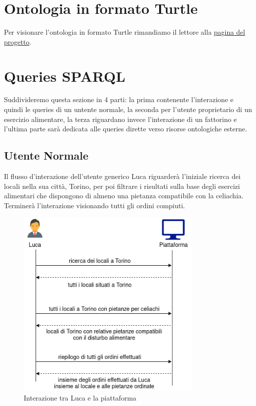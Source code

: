 \documentclass[12pt]{article}
\begin{document}
\section{Ontologia in formato Turtle}
Per visionare l'ontologia in formato Turtle rimandiamo il lettore alla \href{https://lorenzosciandra.github.io/ProgettoModSem/}{pagina del progetto}.

\section{Queries SPARQL}
Suddivideremo questa sezione in 4 parti: la prima contenente l'interazione e quindi le queries di un untente normale, la seconda per l'utente proprietario di un esercizio alimentare, la terza riguardano invece l'interazione di un fattorino e l'ultima parte sarà dedicata alle queries dirette verso risorse ontologiche esterne.

\subsection{Utente Normale}
Il flusso d'interazione dell'utente generico Luca riguarderà l'iniziale ricerca dei locali nella sua città, Torino, per poi filtrare i risultati sulla base degli esercizi alimentari che dispongono di almeno una pietanza compatibile con la celiachia. Terminerà l'interazione visionando tutti gli ordini compiuti.
\begin{figure}[H]
    \centering
         \includegraphics[width=9cm]{files/lucaInterazione.png}
    \caption{Interazione tra Luca e la piattaforma}
\end{figure}
\end{document}
